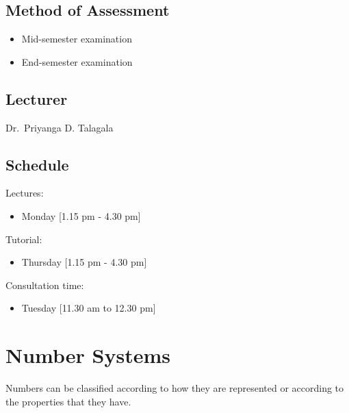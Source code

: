 \documentclass[]{book}
\providecommand{\tightlist}{%
  \setlength{\itemsep}{0pt}\setlength{\parskip}{0pt}}
\begin{document}
\hypertarget{method-of-assessment}{%
\section*{Method of Assessment}\label{method-of-assessment}}

\begin{itemize}
\tightlist
\item
  Mid-semester examination
\item
  End-semester examination
\end{itemize}

\hypertarget{lecturer}{%
\section*{Lecturer}\label{lecturer}}

Dr.~Priyanga D. Talagala

\hypertarget{schedule}{%
\section*{Schedule}\label{schedule}}

Lectures:

\begin{itemize}
\tightlist
\item
  Monday {[}1.15 pm - 4.30 pm{]}
\end{itemize}

Tutorial:

\begin{itemize}
\tightlist
\item
  Thursday {[}1.15 pm - 4.30 pm{]}
\end{itemize}

Consultation time:

\begin{itemize}
\tightlist
\item
  Tuesday {[}11.30 am to 12.30 pm{]}
\end{itemize}

\hypertarget{number-systems}{%
\chapter{Number Systems}\label{number-systems}}

Numbers can be classified according to how they are represented or according to the properties that they have.
\end{document}
